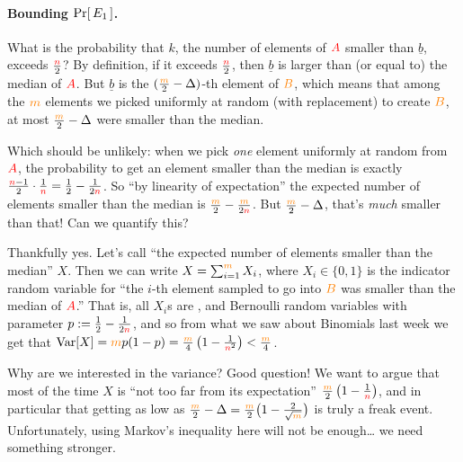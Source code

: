 \paragraph{Bounding $\probaOf{E_1}$.} What is the probability that $k$, the number of elements of $\textcolor{red}{A}$ smaller than $\underline{b}$, exceeds $\frac{{\textcolor{red}{n}}}{2}$? By definition, if it exceeds $\frac{{\textcolor{red}{n}}}{2}$, then $\underline{b}$ is larger than (or equal to) the median of $\textcolor{red}{A}$. But $\underline{b}$ is the $(\frac{\textcolor{orange}{m}}{2} - \Delta)$-th element of $\textcolor{orange}{B}$, which means that among the $\textcolor{orange}{m}$ elements we picked uniformly at random (with replacement) to create $\textcolor{orange}{B}$, at most $\frac{\textcolor{orange}{m}}{2} - \Delta$ were smaller than the median.

Which should be unlikely: when we pick \emph{one} element uniformly at random from $\textcolor{red}{A}$, the probability to get an element smaller than the median is exactly $\frac{{\textcolor{red}{n}}-1}{2}\cdot \frac{1}{{\textcolor{red}{n}}} = \frac{1}{2} - \frac{1}{2{\textcolor{red}{n}}}$. So ``by linearity of expectation'' the expected number of elements smaller than the median is $\frac{\textcolor{orange}{m}}{2} - \frac{\textcolor{orange}{m}}{2{\textcolor{red}{n}}}$. But $\frac{\textcolor{orange}{m}}{2} - \Delta$, that's \emph{much} smaller than that! Can we quantify this?

Thankfully yes. Let's call ``the expected number of elements smaller than the median'' $X$. Then we can write $X = \sum_{i=1}^{\textcolor{orange}{m}} X_i$, where $X_i\in\{0,1\}$ is the indicator random variable for ``the $i$-th element sampled to go into $\textcolor{orange}{B}$ was smaller than the median of $\textcolor{red}{A}$.'' That is, all $X_i$s are \iid, and Bernoulli random variables with parameter $p := \frac{1}{2} - \frac{1}{2{\textcolor{red}{n}}}$, and so from what we saw about Binomials last week we get that $\operatorname{Var}[X] = \textcolor{orange}{m}p(1-p) = \frac{\textcolor{orange}{m}}{4}\left(1-\frac{1}{{\textcolor{red}{n}}^2}\right) < \frac{\textcolor{orange}{m}}{4}$.

Why are we interested in the variance? Good question! We want to argue that most of the time $X$ is ``not too far from its expectation'' $\frac{\textcolor{orange}{m}}{2}\left(1-\frac{1}{{\textcolor{red}{n}}}\right)$, and in particular that getting as low as $\frac{\textcolor{orange}{m}}{2} - \Delta = \frac{\textcolor{orange}{m}}{2}\big(1 - \frac{2}{\sqrt{\textcolor{orange}{m}}}\big)$ is truly a freak event. Unfortunately, using Markov's inequality here will not be enough\dots{} we need something stronger. 

